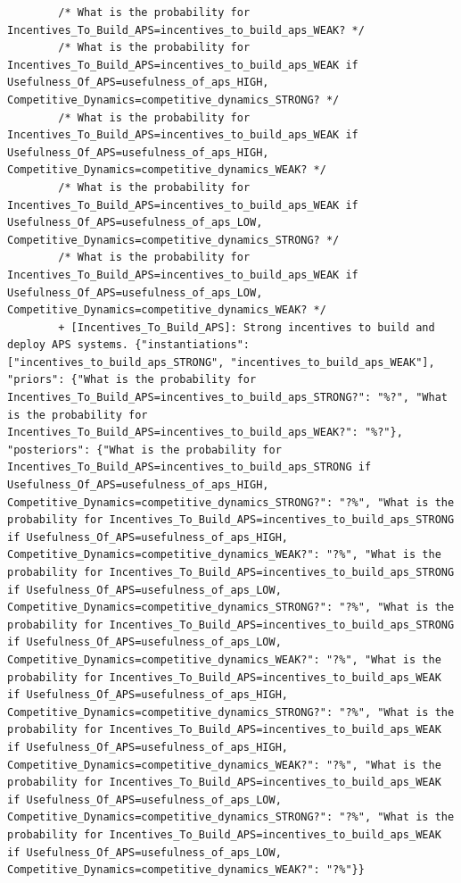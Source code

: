 \documentclass[
  11pt,
  letterpaper,
]{book}
\begin{document}
\begin{landscape}
\begin{verbatim}
        /* What is the probability for Incentives_To_Build_APS=incentives_to_build_aps_WEAK? */
        /* What is the probability for Incentives_To_Build_APS=incentives_to_build_aps_WEAK if Usefulness_Of_APS=usefulness_of_aps_HIGH, Competitive_Dynamics=competitive_dynamics_STRONG? */
        /* What is the probability for Incentives_To_Build_APS=incentives_to_build_aps_WEAK if Usefulness_Of_APS=usefulness_of_aps_HIGH, Competitive_Dynamics=competitive_dynamics_WEAK? */
        /* What is the probability for Incentives_To_Build_APS=incentives_to_build_aps_WEAK if Usefulness_Of_APS=usefulness_of_aps_LOW, Competitive_Dynamics=competitive_dynamics_STRONG? */
        /* What is the probability for Incentives_To_Build_APS=incentives_to_build_aps_WEAK if Usefulness_Of_APS=usefulness_of_aps_LOW, Competitive_Dynamics=competitive_dynamics_WEAK? */
        + [Incentives_To_Build_APS]: Strong incentives to build and deploy APS systems. {"instantiations": ["incentives_to_build_aps_STRONG", "incentives_to_build_aps_WEAK"], "priors": {"What is the probability for Incentives_To_Build_APS=incentives_to_build_aps_STRONG?": "%?", "What is the probability for Incentives_To_Build_APS=incentives_to_build_aps_WEAK?": "%?"}, "posteriors": {"What is the probability for Incentives_To_Build_APS=incentives_to_build_aps_STRONG if Usefulness_Of_APS=usefulness_of_aps_HIGH, Competitive_Dynamics=competitive_dynamics_STRONG?": "?%", "What is the probability for Incentives_To_Build_APS=incentives_to_build_aps_STRONG if Usefulness_Of_APS=usefulness_of_aps_HIGH, Competitive_Dynamics=competitive_dynamics_WEAK?": "?%", "What is the probability for Incentives_To_Build_APS=incentives_to_build_aps_STRONG if Usefulness_Of_APS=usefulness_of_aps_LOW, Competitive_Dynamics=competitive_dynamics_STRONG?": "?%", "What is the probability for Incentives_To_Build_APS=incentives_to_build_aps_STRONG if Usefulness_Of_APS=usefulness_of_aps_LOW, Competitive_Dynamics=competitive_dynamics_WEAK?": "?%", "What is the probability for Incentives_To_Build_APS=incentives_to_build_aps_WEAK if Usefulness_Of_APS=usefulness_of_aps_HIGH, Competitive_Dynamics=competitive_dynamics_STRONG?": "?%", "What is the probability for Incentives_To_Build_APS=incentives_to_build_aps_WEAK if Usefulness_Of_APS=usefulness_of_aps_HIGH, Competitive_Dynamics=competitive_dynamics_WEAK?": "?%", "What is the probability for Incentives_To_Build_APS=incentives_to_build_aps_WEAK if Usefulness_Of_APS=usefulness_of_aps_LOW, Competitive_Dynamics=competitive_dynamics_STRONG?": "?%", "What is the probability for Incentives_To_Build_APS=incentives_to_build_aps_WEAK if Usefulness_Of_APS=usefulness_of_aps_LOW, Competitive_Dynamics=competitive_dynamics_WEAK?": "?%"}}

\end{verbatim}
\end{landscape}
\end{document}
